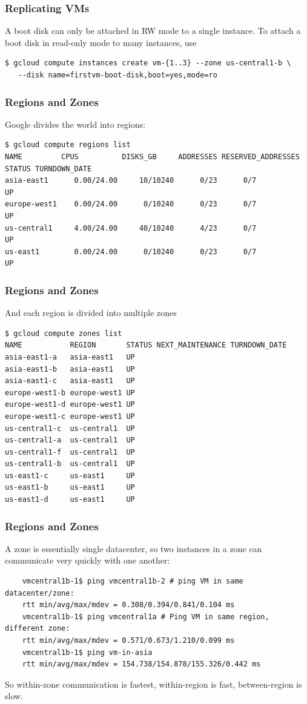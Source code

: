 \documentclass[9pt]{beamer}
\begin{document}
\begin{frame}[fragile]
  \frametitle{Replicating VMs}
  A boot disk can only be attached in RW mode to a single instance. To attach a boot disk in read-only mode to many instances, use
  \begin{verbatim}
$ gcloud compute instances create vm-{1..3} --zone us-central1-b \
   --disk name=firstvm-boot-disk,boot=yes,mode=ro
  \end{verbatim}
\end{frame}

\begin{frame}[fragile]
  \frametitle{Regions and Zones}
  Google divides the world into regions:
  \begin{verbatim}
$ gcloud compute regions list
NAME         CPUS          DISKS_GB     ADDRESSES RESERVED_ADDRESSES STATUS TURNDOWN_DATE
asia-east1      0.00/24.00     10/10240      0/23      0/7           UP
europe-west1    0.00/24.00      0/10240      0/23      0/7           UP
us-central1     4.00/24.00     40/10240      4/23      0/7           UP
us-east1        0.00/24.00      0/10240      0/23      0/7           UP
  \end{verbatim}
\end{frame}

\begin{frame}[fragile]
  \frametitle{Regions and Zones}
  And each region is divided into multiple zones
\begin{verbatim}
$ gcloud compute zones list
NAME           REGION       STATUS NEXT_MAINTENANCE TURNDOWN_DATE
asia-east1-a   asia-east1   UP
asia-east1-b   asia-east1   UP
asia-east1-c   asia-east1   UP
europe-west1-b europe-west1 UP
europe-west1-d europe-west1 UP
europe-west1-c europe-west1 UP
us-central1-c  us-central1  UP
us-central1-a  us-central1  UP
us-central1-f  us-central1  UP
us-central1-b  us-central1  UP
us-east1-c     us-east1     UP
us-east1-b     us-east1     UP
us-east1-d     us-east1     UP
\end{verbatim}
\end{frame}

\begin{frame}[fragile]
  \frametitle{Regions and Zones}
  A zone is essentially single datacenter, so two instances in a zone can communicate very quickly with one another:
  \begin{verbatim}
    vmcentral1b-1$ ping vmcentral1b-2 # ping VM in same datacenter/zone:
    rtt min/avg/max/mdev = 0.308/0.394/0.841/0.104 ms
    vmcentral1b-1$ ping vmcentral1a # Ping VM in same region, different zone:
    rtt min/avg/max/mdev = 0.571/0.673/1.210/0.099 ms
    vmcentral1b-1$ ping vm-in-asia 
    rtt min/avg/max/mdev = 154.738/154.878/155.326/0.442 ms
  \end{verbatim}
  So within-zone communication is fastest, within-region is fast, between-region is slow.
\end{frame}
\end{document}
